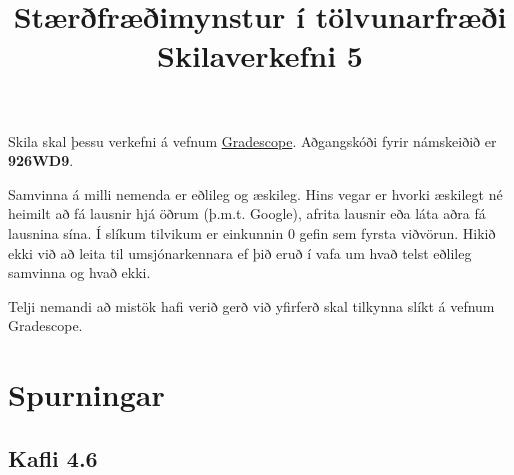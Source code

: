\documentclass{exam}
\title{Stærðfræðimynstur í tölvunarfræði \\ Skilaverkefni 5}
\author{}
\begin{document}
\maketitle
\thispagestyle{empty} 

Skila skal þessu verkefni á vefnum \href{https://gradescope.com/}{Gradescope}. Aðgangskóði fyrir námskeiðið er \textbf{926WD9}.

Samvinna á milli nemenda er eðlileg og æskileg. Hins vegar er hvorki æskilegt né heimilt að fá lausnir hjá öðrum (þ.m.t. Google), afrita lausnir eða láta aðra fá lausnina sína. Í slíkum tilvikum er einkunnin 0 gefin sem fyrsta viðvörun. Hikið ekki við að leita til umsjónarkennara ef þið eruð í vafa um hvað telst eðlileg samvinna og hvað ekki.

Telji nemandi að mistök hafi verið gerð við yfirferð skal tilkynna slíkt á vefnum Gradescope.

\section{Spurningar}

\subsection{Kafli 4.6}
\end{document}
